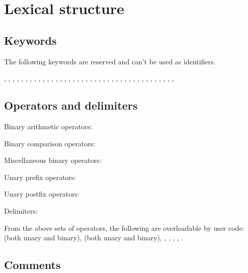 
\chapter{Lexical structure}

\section{Keywords}

The following keywords are reserved and can't be used as identifiers.

, , , , , , , , ,
, , , , , , , , , ,
, , , , , , , , ,
, , , , , , , , ,
, , , \code{\_}

\section{Operators and delimiters}

Binary arithmetic operators:

\code{+ - * / ** \% \& \&\& | || \string^ << >> += -= *= /= **= \%= \&= \&\&= |= ||= \string^= <<= >>=}

Binary comparison operators:

\code{== != < > <= >=}

Miscellaneous binary operators:


Unary prefix operators:

\code{+ - * \& ! \~{}}

Unary postfix operators:

\code{++ -- !}

Delimiters:


From the above sets of operators, the following are overloadable by user code:
\code{+} (both unary and binary), \code{-} (both unary and binary), \code{*},
\code{/}, \code{\%}, \code{==}, \code{<}.

\section{Comments}

